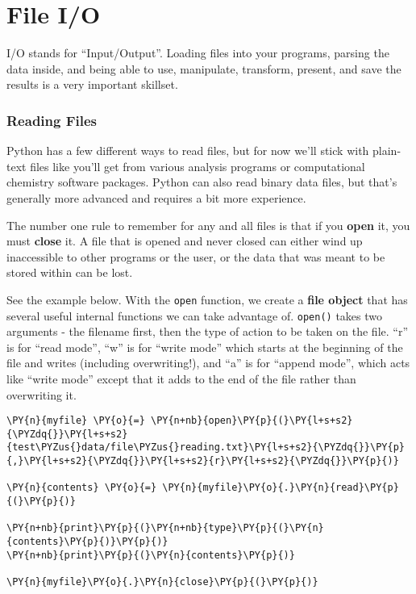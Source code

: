 \section{File I/O}
I/O stands for ``Input/Output''. Loading files into your programs,
parsing the data inside, and being able to use, manipulate, transform,
present, and save the results is a very important skillset.

    \hypertarget{reading-files}{%
\subsubsection{Reading Files}\label{reading-files}}

Python has a few different ways to read files, but for now we'll stick
with plain-text files like you'll get from various analysis programs or
computational chemistry software packages. Python can also read binary
data files, but that's generally more advanced and requires a bit more
experience.

The number one rule to remember for any and all files is that if you
\textbf{open} it, you must \textbf{close} it. A file that is opened and
never closed can either wind up inaccessible to other programs or the
user, or the data that was meant to be stored within can be lost.

See the example below. With the \texttt{open} function, we create a
\textbf{file object} that has several useful internal functions we can
take advantage of. \texttt{open()} takes two arguments - the filename
first, then the type of action to be taken on the file. ``r'' is for
``read mode'', ``w'' is for ``write mode'' which starts at the beginning
of the file and writes (including overwriting!), and ``a'' is for
``append mode'', which acts like ``write mode'' except that it adds to
the end of the file rather than overwriting it.

    \begin{tcolorbox}[breakable, size=fbox, boxrule=1pt, pad at break*=1mm,colback=cellbackground, colframe=cellborder]
\begin{Verbatim}[commandchars=\\\{\}]
\PY{n}{myfile} \PY{o}{=} \PY{n+nb}{open}\PY{p}{(}\PY{l+s+s2}{\PYZdq{}}\PY{l+s+s2}{test\PYZus{}data/file\PYZus{}reading.txt}\PY{l+s+s2}{\PYZdq{}}\PY{p}{,}\PY{l+s+s2}{\PYZdq{}}\PY{l+s+s2}{r}\PY{l+s+s2}{\PYZdq{}}\PY{p}{)}

\PY{n}{contents} \PY{o}{=} \PY{n}{myfile}\PY{o}{.}\PY{n}{read}\PY{p}{(}\PY{p}{)}

\PY{n+nb}{print}\PY{p}{(}\PY{n+nb}{type}\PY{p}{(}\PY{n}{contents}\PY{p}{)}\PY{p}{)}
\PY{n+nb}{print}\PY{p}{(}\PY{n}{contents}\PY{p}{)}

\PY{n}{myfile}\PY{o}{.}\PY{n}{close}\PY{p}{(}\PY{p}{)}
\end{Verbatim}
\end{tcolorbox}

